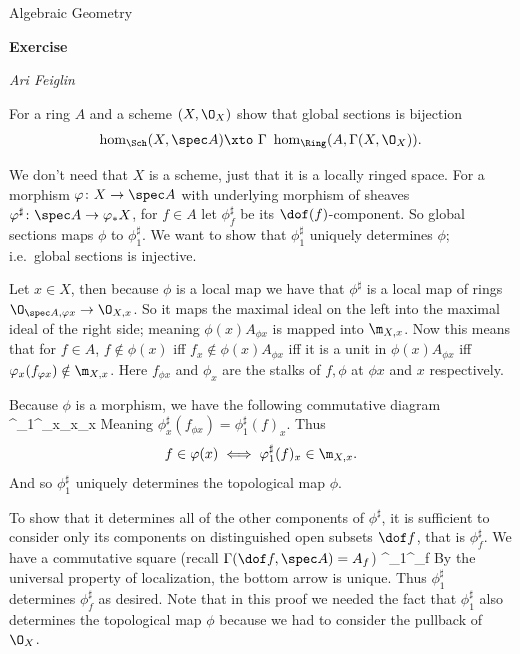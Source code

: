 

\def\printmcount{\the\counter{section}.\the\counter{math counter}}
\setcounter{section}{2}

\centerline{Algebraic Geometry}
\medskip
\centerline{\bf Exercise \the{}}
\smallskip
\centerline{\it Ari Feiglin}

\bprob[title={Hartshorne II.2.4}]

    For a ring $A$ and a scheme $(X,\O_X)$ show that global sections is bijection
    $$ \hom_\Sch(X,\spec A) \xtos\Gamma \hom_\Ring(A,\Gamma(X,\O_X)) . $$

\eprob

We don't need that $X$ is a scheme, just that it is a locally ringed space.
For a morphism $\phi\colon X\to\spec A$ with underlying morphism of sheaves
$\phi^\sharp\colon\spec A\to\phi_*X$, for $f\in A$ let $\phi^\sharp_f$ be its $\dof(f)$-component.
So global sections maps $\phi$ to $\phi^\sharp_1$.
We want to show that $\phi^\sharp_1$ uniquely determines $\phi$; i.e.\ global sections is injective.

Let $x\in X$, then because $\phi$ is a local map we have that $\phi^\sharp$ is a local map of rings
$\O_{\spec A,\phi x}\to \O_{X,x}$.
So it maps the maximal ideal on the left into the maximal ideal of the right side; meaning
$\phi(x)A_{\phi x}$ is mapped into $\m_{X,x}$.
Now this means that for $f\in A$, $f\notin\phi(x)$ iff $f_x\notin\phi(x)A_{\phi x}$ iff it is a unit in
$\phi(x)A_{\phi x}$ iff $\phi_x(f_{\phi x})\notin\m_{X,x}$.
Here $f_{\phi x}$ and $\phi_x$ are the stalks of $f,\phi$ at $\phi x$ and $x$ respectively.

Because $\phi$ is a morphism, we have the following commutative diagram
    {\phi^\sharp_1}{\phi^\sharp_x}{\bul_{\phi x}}{\bul_x}
Meaning $\phi^\sharp_x(f_{\phi x})=\phi^\sharp_1(f)_x$.
Thus
$$ f\in\phi(x) \iff \phi^\sharp_1(f)_x \in \m_{X,x} . $$
And so $\phi^\sharp_1$ uniquely determines the topological map $\phi$.

To show that it determines all of the other components of $\phi^\sharp$, it is sufficient to consider
only its components on distinguished open subsets $\dof f$, that is $\phi^\sharp_f$.
We have a commutative square (recall $\Gamma(\dof f,\spec A)=A_f$)
    {\phi^\sharp_1}{\phi^\sharp_f}{\res}{\res}
By the universal property of localization, the bottom arrow is unique.
Thus $\phi^\sharp_1$ determines $\phi^\sharp_f$ as desired.
Note that in this proof we needed the fact that $\phi^\sharp_1$ also determines the topological map $\phi$
because we had to consider the pullback of $\O_X$.


